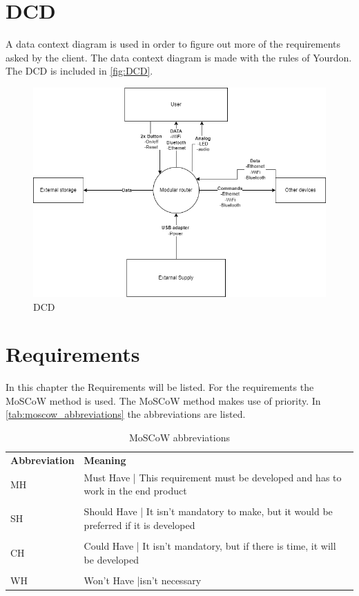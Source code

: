 \section{DCD}
A data context diagram is used in order to figure out more of the requirements asked by the client. The data context diagram is made with the rules of Yourdon. The DCD is included in \autoref{fig:DCD}.

\begin{figure}[H]
    \hspace{-2.5cm}
    \includegraphics[width=20cm]{Images/Definition phase/DCD.drawio.png}
    \caption{DCD}
    \label{fig:DCD}
\end{figure}

\newpage
\section{Requirements}
In this chapter the Requirements will be listed. For the requirements the MoSCoW method is used. The MoSCoW method makes use of priority. In \autoref{tab:moscow_abbreviations} the abbreviations are listed.

\begin{table}[H]
\centering
    \begin{tabular}{l p{8cm}}
        \textbf{Abbreviation} & \textbf{Meaning} \\
        MH & Must Have | This requirement must be developed and has to work in the end product\\
        & \\
        SH & Should Have | It isn't mandatory to make, but it would be preferred if it is developed\\
        & \\
        CH & Could Have | It isn't mandatory, but if there is time, it will be developed\\
        & \\
        WH & Won't Have |isn't necessary\\
    \end{tabular}
    \caption{MoSCoW abbreviations}
    \label{tab:moscow_abbreviations}
\end{table}

